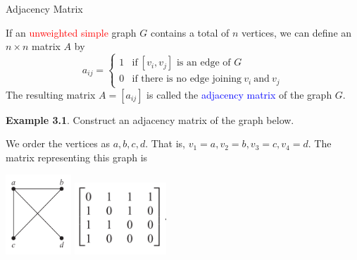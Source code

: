 \documentclass[aspectratio=169]{beamer}
\providecommand{\Blue}[1]{\textcolor{blue}{#1}}
\providecommand{\Red}[1]{\textcolor{red}{#1}}
\begin{document}
\begin{frame}[plain]{Adjacency Matrix}

 If an \Red{unweighted simple} graph $G$ contains 
   a total of $n$ vertices, we can define an $n\times n$ matrix $A$ by
  \[ 
   a_{ij} = \left\{ \begin{array}{ll}
       1 & \mbox{if}\ [v_i, v_j] \mbox{\ is an edge of\ } G\\
       0 & \mbox{if there is no edge joining}\ v_i\ \mbox{and}\ v_j
       \end{array}
       \right.
\] 
The resulting matrix $A=[a_{ij}]$ is called the \Blue{adjacency matrix} of the graph $G$.
\medskip

\pause

{\bf Example 3.1}. Construct an adjacency matrix of the graph below.
\medskip

  We order the vertices as $a, b, c, d$. That is, $v_1 = a, v_2=b, v_3=c, v_4=d$.
  The matrix representing this graph is

 \begin{center}
  \includegraphics[height=3cm]{./img/lecture3-fig2a.png}\hspace{.4in}\pause
   \includegraphics[height=2.7cm]{./img/lecture3-fig2b.png}
 \end{center}
 
\end{frame}
\end{document}
